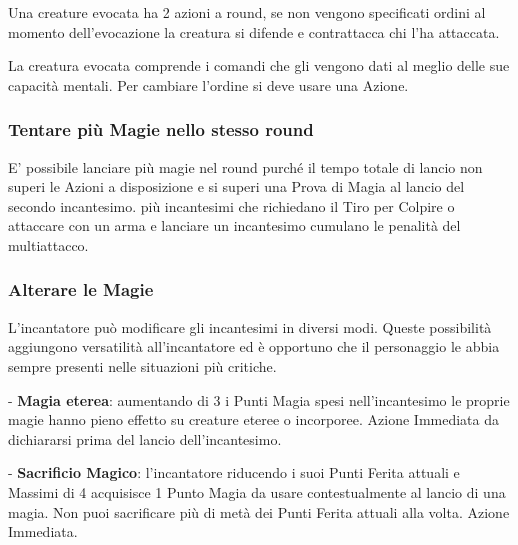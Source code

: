 \begin{multicols}{2}
Una creature evocata ha 2 azioni a round, se non vengono specificati ordini al momento dell'evocazione la creatura si difende e contrattacca chi l'ha attaccata.

La creatura evocata comprende i comandi che gli vengono dati al meglio delle sue capacità mentali. Per cambiare l'ordine si deve usare una Azione.

\subsubsection{Tentare più Magie nello stesso round}\hypertarget{piumagieround}{}\label{piumagieround}

E' possibile lanciare più magie nel round purché il tempo totale di lancio non superi le Azioni a disposizione e si superi una Prova di Magia al lancio del secondo incantesimo. più incantesimi che richiedano il Tiro per Colpire o attaccare con un arma e lanciare un incantesimo cumulano le penalità del multiattacco.

\subsubsection{Alterare le Magie}\label{magiealteraremagie}

L'incantatore può modificare gli incantesimi in diversi modi. Queste possibilità aggiungono versatilità all'incantatore ed è opportuno che il personaggio le abbia sempre presenti nelle situazioni più critiche.


- \textbf{Magia eterea}: aumentando di 3 i Punti Magia spesi nell'incantesimo le proprie magie hanno pieno effetto su creature eteree o incorporee. Azione Immediata da dichiararsi prima del lancio dell'incantesimo.

- \textbf{Sacrificio Magico}: l'incantatore riducendo i suoi Punti Ferita attuali e Massimi di 4 acquisisce 1 Punto Magia da usare contestualmente al lancio di una magia. Non puoi sacrificare più di metà dei Punti Ferita attuali alla volta. Azione Immediata.


\end{multicols}
